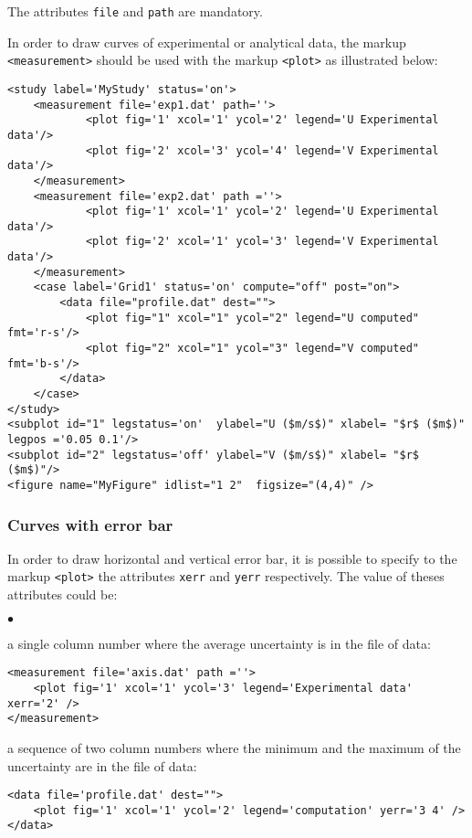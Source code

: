 \documentclass[a4paper,10pt,twoside]{csshortdoc}
\begin{document}
The attributes \texttt{file} and \texttt{path} are mandatory.

In order to draw curves of experimental or analytical data, the markup \texttt{<measurement>}
should be used with the markup \texttt{<plot>} as illustrated below:

\small
\begin{verbatim}
<study label='MyStudy' status='on'>
    <measurement file='exp1.dat' path=''>
            <plot fig='1' xcol='1' ycol='2' legend='U Experimental data'/>
            <plot fig='2' xcol='3' ycol='4' legend='V Experimental data'/>
    </measurement>
    <measurement file='exp2.dat' path =''>
            <plot fig='1' xcol='1' ycol='2' legend='U Experimental data'/>
            <plot fig='2' xcol='1' ycol='3' legend='V Experimental data'/>
    </measurement>
    <case label='Grid1' status='on' compute="off" post="on">
        <data file="profile.dat" dest="">
            <plot fig="1" xcol="1" ycol="2" legend="U computed" fmt='r-s'/>
            <plot fig="2" xcol="1" ycol="3" legend="V computed" fmt='b-s'/>
        </data>
    </case>
</study>
<subplot id="1" legstatus='on'  ylabel="U ($m/s$)" xlabel= "$r$ ($m$)" legpos ='0.05 0.1'/>
<subplot id="2" legstatus='off' ylabel="V ($m/s$)" xlabel= "$r$ ($m$)"/>
<figure name="MyFigure" idlist="1 2"  figsize="(4,4)" />
\end{verbatim}
\normalsize

\subsubsection{Curves with error bar}\label{sec:err}

In order to draw horizontal and vertical error bar, it is possible to
specify to the markup \texttt{<plot>} the attributes \texttt{xerr} and
\texttt{yerr} respectively. The value of theses attributes could be:
\begin{list}{$\bullet$}{}
\item a single column number where the average uncertainty is in the file of
data:
\small
\begin{verbatim}
<measurement file='axis.dat' path =''>
    <plot fig='1' xcol='1' ycol='3' legend='Experimental data' xerr='2' />
</measurement>
\end{verbatim}
\normalsize
\item a sequence of two column numbers where the minimum and the maximum
of the uncertainty are in the file of data:
\small
\begin{verbatim}
<data file='profile.dat' dest="">
    <plot fig='1' xcol='1' ycol='2' legend='computation' yerr='3 4' />
</data>
\end{verbatim}
\normalsize
\end{list}
\end{document}
